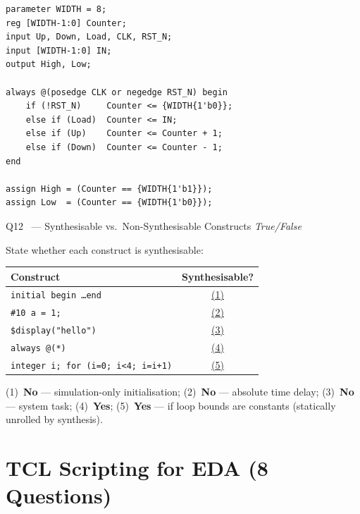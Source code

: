 \documentclass[12pt,a4paper]{article}
\newcommand{\moderate}{%
  \fbox{\textcolor{modoran}{\bfseries\sffamily\small MODERATE}}}
\begin{document}
\begin{answerbox}
\begin{lstlisting}[style=verilogstyle]
parameter WIDTH = 8;
reg [WIDTH-1:0] Counter;
input Up, Down, Load, CLK, RST_N;
input [WIDTH-1:0] IN;
output High, Low;

always @(posedge CLK or negedge RST_N) begin
    if (!RST_N)     Counter <= {WIDTH{1'b0}};
    else if (Load)  Counter <= IN;
    else if (Up)    Counter <= Counter + 1;
    else if (Down)  Counter <= Counter - 1;
end

assign High = (Counter == {WIDTH{1'b1}});
assign Low  = (Counter == {WIDTH{1'b0}});
\end{lstlisting}
\end{answerbox}

\begin{questionbox}{Q12 \moderate\ --- Synthesisable vs.\ Non-Synthesisable Constructs \hfill\textit{True/False}}

State whether each construct is synthesisable:

\begin{center}
\begin{tabular}{|l|c|}
\hline
\rowcolor{dkblue!15}
\textbf{Construct} & \textbf{Synthesisable?}\\
\hline
\texttt{initial begin \ldots end} & \underline{(1)}\\
\hline
\texttt{\#10 a = 1;} & \underline{(2)}\\
\hline
\texttt{\$display("hello")} & \underline{(3)}\\
\hline
\texttt{always @(*)} & \underline{(4)}\\
\hline
\texttt{integer i; for (i=0; i<4; i=i+1)} & \underline{(5)}\\
\hline
\end{tabular}
\end{center}
\end{questionbox}

\begin{answerbox}
(1)~\textbf{No} --- simulation-only initialisation;
(2)~\textbf{No} --- absolute time delay;
(3)~\textbf{No} --- system task;
(4)~\textbf{Yes};
(5)~\textbf{Yes} --- if loop bounds are constants (statically unrolled by synthesis).
\end{answerbox}

\section{TCL Scripting for EDA (8 Questions)}
\label{sec:tcl}
\end{document}
